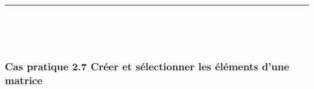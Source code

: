 \documentclass[12pt,twosided, notitlepage]{book}
\begin{document}
\begin{center}\rule{0.5\linewidth}{\linethickness}\end{center}

~

~

\hypertarget{cas-pratique-2.7-creer-et-selectionner-les-elements-dune-matrice}{%
\subsubsection{\texorpdfstring{\textbf{Cas pratique 2.7} Créer et
sélectionner les éléments d'une
matrice}{Cas pratique 2.7 Créer et sélectionner les éléments d'une matrice}}\label{cas-pratique-2.7-creer-et-selectionner-les-elements-dune-matrice}}

\end{document}
